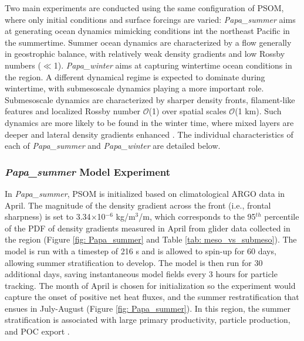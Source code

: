 \documentclass[draft,linenumbers]{agujournal2018}
\begin{document}
Two main experiments are conducted using the same configuration of PSOM, where only initial conditions and surface forcings are varied: \textit{Papa\_summer} aims at generating ocean dynamics mimicking conditions int the northeast Pacific in the summertime. Summer ocean dynamics are characterized by a flow generally in geostrophic balance, with relatively weak density gradients and low Rossby numbers ($\ll$1). \textit{Papa\_winter} aims at capturing wintertime ocean conditions in the region. A different dynamical regime is expected to dominate during wintertime, with submesoscale dynamics playing a more important role. Submesoscale dynamics are characterized by sharper density fronts, filament-like features and localized Rossby number $\mathcal{O}$(1) over spatial scales $\mathcal{O}$(1 km). Such dynamics are more likely to be found in the winter time, where mixed layers are deeper and lateral density gradients enhanced \citep{Thompson_2016}. The individual characteristics of each of \textit{Papa\_summer} and \textit{Papa\_winter} are detailed below.

\subsubsection{\textit{Papa\_summer} Model Experiment}

In \textit{Papa\_summer}, PSOM is initialized based on climatological ARGO data in April. The magnitude of the density gradient across the front (i.e., frontal sharpness) is set to 3.34$\times$10$^{-6}$ kg/m$^3$/m, which corresponds to the 95$^{th}$ percentile of the PDF of density gradients measured in April from glider data collected in the region (Figure \ref{fig: Papa_summer} and Table \ref{tab: meso_vs_submeso}). The model is run with a timestep of 216 s and is allowed to spin-up for 60 days, allowing summer stratification to develop. The model is then run for 30 additional days, saving instantaneous model fields every 3 hours for particle tracking. The month of April is chosen for initialization so the experiment would capture the onset of positive net heat fluxes, and the summer restratification that ensues in July-August (Figure \ref{fig: Papa_summer}). In this region, the summer stratification is associated with large primary productivity, particle production, and POC export \citep[e.g., fecal pallets, dead phytoplankter; ][]{Plant_2016}.
\end{document}
